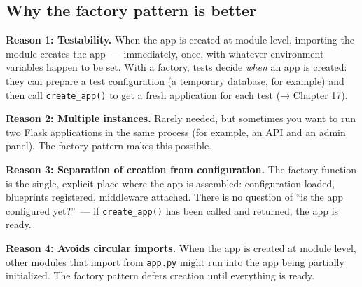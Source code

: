 \begin{codebox}[short]

\begin{Shaded}
\begin{Highlighting}[]

\OperatorTok{=}\NormalTok{)}
\end{Highlighting}
\end{Shaded}

\end{codebox}

\subsection*{Why the factory pattern is better}\label{15-structuring-the-application:why-the-factory-pattern-is-better}

\textbf{Reason 1: Testability.} When the app is created at module level, importing the module creates the app~--- immediately, once, with whatever environment variables happen to be set. With a factory, tests decide \emph{when} an app is created: they can prepare a test configuration (a temporary database, for example) and then call \texttt{create\_app()} to get a fresh application for each test (→ \hyperref[ch:17-build-process]{Chapter 17}).

\textbf{Reason 2: Multiple instances.} Rarely needed, but sometimes you want to run two Flask applications in the same process (for example, an API and an admin panel). The factory pattern makes this possible.

\textbf{Reason 3: Separation of creation from configuration.} The factory function is the single, explicit place where the app is assembled: configuration loaded, blueprints registered, middleware attached. There is no question of ``is the app configured yet?''~--- if \texttt{create\_app()} has been called and returned, the app is ready.

\textbf{Reason 4: Avoids circular imports.} When the app is created at module level, other modules that import from \texttt{app.py} might run into the app being partially initialized. The factory pattern defers creation until everything is ready.


